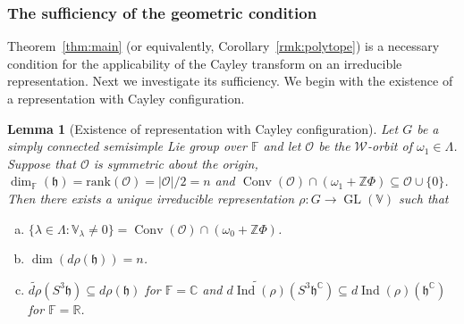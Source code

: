 \documentclass[11pt,reqno]{amsart}
\DeclareMathOperator{\GL}{GL}
\DeclareMathOperator{\Ind}{Ind}
\DeclareMathOperator{\Conv}{Conv}
\newtheorem{lemma}[theorem]{Lemma}
\newcommand{\rank}{\mathrm{rank}} %
\newcommand{\W}{\mathcal{W}}
\begin{document}
\subsubsection{The sufficiency of the geometric condition}Theorem~\ref{thm:main} (or equivalently,   Corollary~\ref{rmk:polytope}) is a necessary condition for the applicability of the Cayley transform on an irreducible representation.  Next we investigate its sufficiency.  We begin with the existence of a representation with Cayley configuration.
\begin{lemma}[Existence of representation with Cayley configuration]\label{prop:orbit to complex contain}
Let $G$ be a simply connected semisimple Lie group over $\mathbb{F}$ and let $\mathcal{O}$ be the $\W$-orbit of $\omega_1 \in \Lambda$.  Suppose that $\mathcal{O}$ is symmetric about the origin,  $\dim_{\mathbb{F}} (\mathfrak{h}) = \rank(\mathcal{O}) = |\mathcal{O}|/2 = n$ and $\Conv(\mathcal{O}) \cap \left( \omega_1 + \mathbb{Z} \Phi \right) \subseteq \mathcal{O} \cup \{ 0 \}$.   Then there exists a unique irreducible representation $\rho: G \to \GL(\mathbb{V})$ such that 
\begin{enumerate}[a)]
\item $\{\lambda \in \Lambda: \mathbb{V}_{\lambda} \ne 0 \} = \Conv(\mathcal{O}) \cap (\omega_0 + \mathbb{Z} \Phi)$.  \label{prop:orbit to complex contain:item1}
\item $\dim \left( d \rho (\mathfrak{h} ) \right) = n$. \label{prop:orbit to complex contain:item2}
\item $\widetilde{ d \rho } \left( S^3 \mathfrak{h} \right) \subseteq d \rho (\mathfrak{h})$ for $\mathbb{F} = \mathbb{C}$ and $\widetilde{ d \Ind (\rho) } \left( S^3 \mathfrak{h}^{\mathbb{C}} \right) \subseteq d \Ind(\rho) (\mathfrak{h}^{\mathbb{C}})$ for $\mathbb{F} = \mathbb{R}$.  \label{prop:orbit to complex contain:item3}
\end{enumerate}
\end{lemma}
\end{document}
